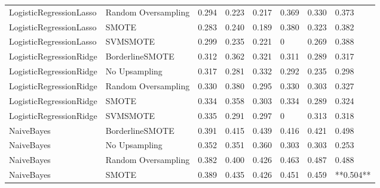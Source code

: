 \begin{tabular}{llllllll}
     LogisticRegressionLasso & Random Oversampling & 0.294 &                     0.223 &                 0.217 &                  0.369 &                                   0.330 &     0.373 \\
     LogisticRegressionLasso &               SMOTE & 0.283 &                     0.240 &                 0.189 &                  0.380 &                                   0.323 &     0.382 \\
     LogisticRegressionLasso &            SVMSMOTE & 0.299 &                     0.235 &                 0.221 &                      0 &                                   0.269 &     0.388 \\
     LogisticRegressionRidge &     BorderlineSMOTE & 0.312 &                     0.362 &                 0.321 &                  0.311 &                                   0.289 &     0.317 \\
     LogisticRegressionRidge &       No Upsampling & 0.317 &                     0.281 &                 0.332 &                  0.292 &                                   0.235 &     0.298 \\
     LogisticRegressionRidge & Random Oversampling & 0.330 &                     0.380 &                 0.295 &                  0.330 &                                   0.303 &     0.327 \\
     LogisticRegressionRidge &               SMOTE & 0.334 &                     0.358 &                 0.303 &                  0.334 &                                   0.289 &     0.324 \\
     LogisticRegressionRidge &            SVMSMOTE & 0.335 &                     0.291 &                 0.297 &                      0 &                                   0.313 &     0.318 \\
                  NaiveBayes &     BorderlineSMOTE & 0.391 &                     0.415 &                 0.439 &                  0.416 &                                   0.421 &     0.498 \\
                  NaiveBayes &       No Upsampling & 0.352 &                     0.351 &                 0.360 &                  0.303 &                                   0.303 &     0.253 \\
                  NaiveBayes & Random Oversampling & 0.382 &                     0.400 &                 0.426 &                  0.463 &                                   0.487 &     0.488 \\
                  NaiveBayes &               SMOTE & 0.389 &                     0.435 &                 0.426 &                  0.451 &                                   0.459 & **0.504** \\

\end{tabular}
